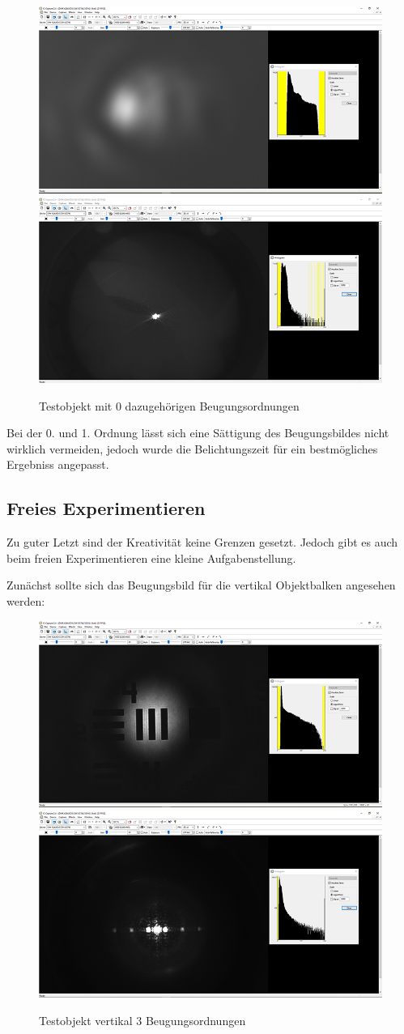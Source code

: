\documentclass[12pt,a4paper,twoside]{article}
\begin{document}
\begin{figure}[H]
    \centering
    \includegraphics[width=0.45\linewidth]{nudes/AbbeTheorie/Aufgabe 2/horizontal/0te ohne.PNG}
    \includegraphics[width=0.45\linewidth]{nudes/AbbeTheorie/Aufgabe 2/horizontal/0te mit.PNG}
    \caption{Testobjekt mit 0 dazugehörigen Beugungsordnungen}
    \label{fig:Aufabe2-0O}
\end{figure}

\noindent
Bei der 0. und 1. Ordnung lässt sich eine Sättigung des Beugungsbildes nicht wirklich vermeiden, jedoch wurde die Belichtungszeit für ein bestmögliches Ergebniss angepasst.


\subsection{Freies Experimentieren}

Zu guter Letzt sind der Kreativität keine Grenzen gesetzt. Jedoch gibt es auch beim freien Experimentieren eine kleine Aufgabenstellung. \newline

\noindent
Zunächst sollte sich das Beugungsbild für die vertikal Objektbalken angesehen werden:

\begin{figure}[H]
    \centering
    \includegraphics[width=0.45\linewidth]{nudes/AbbeTheorie/Aufgabe 3/4-2 vertikal ohne.PNG}
    \includegraphics[width=0.45\linewidth]{nudes/AbbeTheorie/Aufgabe 3/4-2 vertikal mit.PNG}
    \caption{Testobjekt vertikal 3 Beugungsordnungen}
    \label{fig:Aufabe3-horizontal}
\end{figure}
\end{document}
